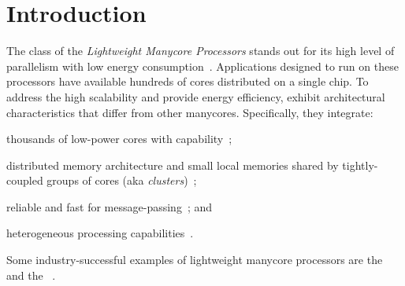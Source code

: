 \section{Introduction}
\label{sec:introduction}

	The class of the \textit{Lightweight Manycore Processors} stands out for
	its high level of parallelism with low energy
	consumption~\cite{francesquini2015}. Applications designed to run on these
	processors have available hundreds of cores distributed on a single chip.
	To address the high scalability and provide energy efficiency, \lws exhibit
	architectural characteristics that differ from other manycores.
	Specifically, they integrate:
	\begin{enumerate*}[label=(\roman*)]
		\item thousands of low-power cores with \mimd capability~\cite{Rossi2017};
		\item distributed memory architecture and small local memories shared by
			tightly-coupled groups of cores (aka \textit{clusters})~\cite{Bohnenstiehl2017};
		\item reliable and fast \nocs for message-passing~\cite{Bohnenstiehl2017}; and
		\item heterogeneous processing capabilities~\cite{Davidson2018}.
	\end{enumerate*}
	Some industry-successful examples of lightweight manycore processors are
	the \mppa~\cite{DeDinechin2013-2} and the \epiphany~\cite{Olofsson2016}.

\iffalse
	Esses processadores introduziram junto de suas vantagens, um conjunto de
	desafios no projeto e desenvolvimento de aplicações de baíxo e alto nível
	inserido pelas suas características arquiteturais. Algumas desses desafios
	são:
	\begin{itemize}
		\item Modelo de Programação Híbrida: uso do modelo de memória
			compartilhada para explorar o paralelismo dentro dos clusters e
			aplicação do modelo de troca de mensagens para lidar com
			comunicação entre clusters através da NoC~\cite{kelly2013};

		\item Falta de suporte em hardware para coerência de cache: para
			reduzir o consumo de energia requirindo o controle explícito da
			memória~\cite{francesquini2015};.

		\item Sistem de memória restritivo: a presença de múltiplos espaços de
			endereçamento e pequenas memórias locais requer o Data Tiling
			e Prefetching seja manipulado em software~\cite{Castro2016};

		\item Configurações heterogeneas: requer a programação de componentes
			distintos, dificultando o deploy de aplicações no
			\lws~\cite{Barbalace2015}.
	\end{itemize}
\fi

